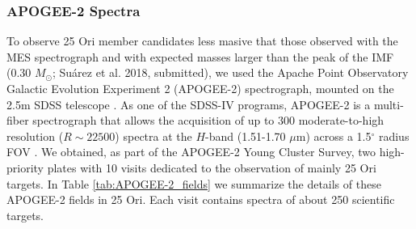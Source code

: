\documentclass[12pt]{article}
\begin{document}
\subsubsection{APOGEE-2 Spectra}
\label{sec_APOGEE-2:spectra}
To observe 25 Ori member candidates less masive that those observed with the MES spectrograph and with expected masses larger than the peak of the IMF (0.30 $M_\odot$; Su\'arez et al. 2018, submitted), we used the Apache Point Observatory Galactic Evolution Experiment 2 (APOGEE-2) spectrograph, mounted on the 2.5m SDSS telescope \citep{Gunn2006,Blanton2017}. As one of the SDSS-IV programs, APOGEE-2 is a multi-fiber spectrograph that allows the acquisition of up to 300 moderate-to-high resolution ($R\sim22500$) spectra at the $H$-band (1.51-1.70 $\mu$m) across a 1.5$^\circ$ radius FOV \citep{Wilson2010,Majewski2017}. We obtained, as part of the APOGEE-2 Young Cluster Survey, two high-priority plates with 10 visits dedicated to the observation of mainly 25 Ori targets. In Table \ref{tab:APOGEE-2_fields} we summarize the details of these APOGEE-2 fields in 25 Ori. Each visit contains spectra of about 250 scientific targets.
\end{document}
